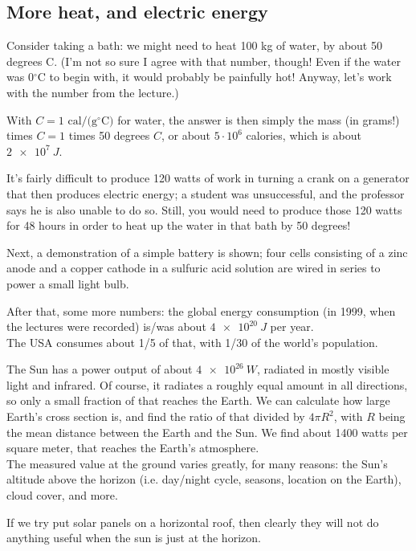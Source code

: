 \subsection{More heat, and electric energy}

Consider taking a bath: we might need to heat 100 kg of water, by about 50 degrees C. (I'm not so sure I agree with that number, though! Even if the water was $0 {}^\circ$C to begin with, it would probably be painfully hot! Anyway, let's work with the number from the lecture.)

With $C = 1 \text{ cal/(g} {}^\circ \text{C})$ for water, the answer is then simply the mass (in grams!) times $C = 1$ times 50 degrees $C$, or about $5 \cdot 10^6$ calories, which is about $\SI{2e7}{J}$.

It's fairly difficult to produce 120 watts of work in turning a crank on a generator that then produces electric energy; a student was unsuccessful, and the professor says he is also unable to do so. Still, you would need to produce those 120 watts for 48 hours in order to heat up the water in that bath by 50 degrees!

Next, a demonstration of a simple battery is shown; four cells consisting of a zinc anode and a copper cathode in a sulfuric acid solution are wired in series to power a small light bulb.

After that, some more numbers: the global energy consumption (in 1999, when the lectures were recorded) is/was about $\SI{4e20}{J}$ per year.\\
The USA consumes about 1/5 of that, with 1/30 of the world's population.

The Sun has a power output of about $\SI{4e26}{W}$, radiated in mostly visible light and infrared. Of course, it radiates a roughly equal amount in all directions, so only a small fraction of that reaches the Earth. We can calculate how large Earth's cross section is, and find the ratio of that divided by $4 \pi R^2$, with $R$ being the mean distance between the Earth and the Sun. We find about 1400 watts per square meter, that reaches the Earth's atmosphere.\\
The measured value at the ground varies greatly, for many reasons: the Sun's altitude above the horizon (i.e. day/night cycle, seasons, location on the Earth), cloud cover, and more.

If we try put solar panels on a horizontal roof, then clearly they will not do anything useful when the sun is just at the horizon.

